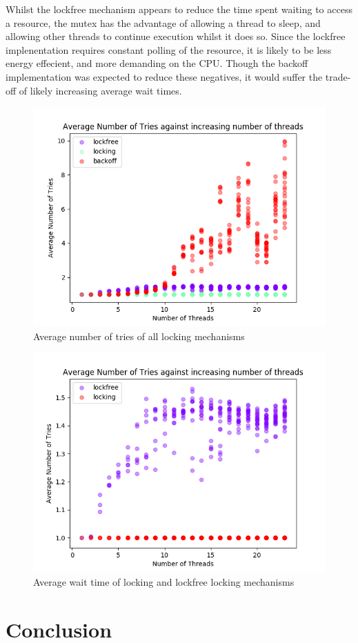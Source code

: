 \documentclass[12pt]{article}
\begin{document}
Whilst the lockfree mechanism appears to reduce the time spent waiting to access a resource, the mutex has the advantage of allowing a thread to sleep, and allowing other threads to continue execution whilst it does so. Since the lockfree implenentation requires constant polling of the resource, it is likely to be less energy effecient, and more demanding on the CPU. Though the backoff implementation was expected to reduce these negatives, it would suffer the trade-off of likely increasing average wait times.

\begin{figure}[!h]
  \centering
  \includegraphics[width=0.8\linewidth]{images/mergedavgtries}
	\caption{Average number of tries of all locking mechanisms}
  \label{fig:mergeavgtries}
\end{figure}

\begin{figure}[!h]
  \centering
  \includegraphics[width=0.8\linewidth]{images/omittedavgtries}
	\caption{Average wait time of locking and lockfree locking mechanisms}
  \label{fig:omittedavgtries}
\end{figure}

\part*{Conclusion}



\end{document}
